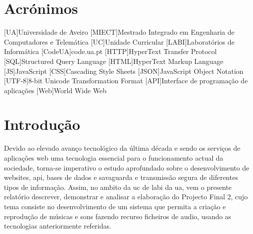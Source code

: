 
 
	
	
	
	
	
	\def\codeua{codeua.jpeg}
	\def\beatmaker{beatmaker.png}


\renewcommand{\contentsname}{Índice}
\tableofcontents
\listoffigures
{}


\chapter*{Acrónimos}
\begin{acronym}

[UA]{Universidade de Aveiro}
[MIECT]{Mestrado Integrado em Engenharia de Computadores e Telemática}
[UC]{Unidade Curricular}
[LABI]{Laboratórios de Informática}
[CodeUA]{code.ua.pt}
[HTTP]{HyperText Transfer Protocol}
[SQL]{Structured Query Language}
[HTML]{HyperText Markup Language}
[JS]{JavaScript}
[CSS]{Cascading Style Sheets}
[JSON]{JavaScript Object Notation}
[UTF-8]{8-bit Unicode Transformation Format}
[API]{Interface de programação de aplicações}
[Web]{World Wide Web}
\end{acronym}


\pagestyle{fancy}
\fancyhf{}
\rhead{\titulo}
\cfoot{\thepage}


\chapter*{Introdução}
\label{chap.Intro}
\begin{multicols}{2}
Devido ao elevado avanço tecnológico da última década e sendo os serviços de aplicações web uma tecnologia essencial para o funcionamento actual da sociedade, torna-se imperativo o estudo aprofundado sobre o desenvolvimento de websites, \ac{api}, bases de dados e savaguarda e transmissão segura de diferentes tipos de informação. Assim, no ambito da \ac{uc} de \ac{labi} da \ac{ua}, vem o presente relatório descrever, demonstrar e analisar a elaboração do Projecto  Final 2, cujo tema consiste no desenvolvimento de um sistema que permita a criação e reprodução de músicas e sons fazendo recurso ficheiros de audio, usando as tecnologias anteriormente referidas. \\
\end{multicols}

